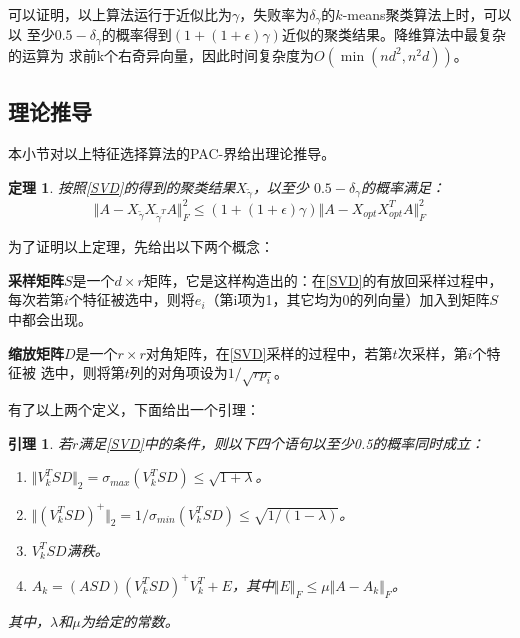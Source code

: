 \documentclass{ctexart}
\begin{document}
    可以证明，以上算法运行于近似比为$\gamma$，失败率为$\delta_\gamma$的$k$-means聚类算法上时，可以以
    至少$0.5-\delta_\gamma$的概率得到$(1+(1+\epsilon)\gamma)$近似的聚类结果。降维算法中最复杂的运算为
    求前k个右奇异向量，因此时间复杂度为$O(\min(nd^2, n^2d))$。

    \subsection{理论推导}
    本小节对以上特征选择算法的PAC-界给出理论推导\cite{boutsidis2009unsupervised,boutsidis2014randomized}。

    \newtheorem{thm}{\bf 定理}[]
    \begin{thm}
    \label{thmsvd}
        按照\autoref{SVD}的得到的聚类结果$X_{\tilde{\gamma}}$，以至少
        $0.5-\delta_\gamma$的概率满足：
        $$
            \Vert A - X_{\tilde{\gamma}} X_{\tilde{\gamma}^T} A \Vert_F^2 \leq (1 + ( 1+\epsilon ) \gamma ) \Vert A - X_{opt} X_{opt}^T A \Vert_F^2
        $$
    \end{thm}

    为了证明以上定理，先给出以下两个概念：

    \textbf{采样矩阵}$S$是一个$d \times r$矩阵，它是这样构造出的：在\autoref{SVD}的有放回采样过程中，
    每次若第$i$个特征被选中，则将$e_i$（第i项为1，其它均为0的列向量）加入到矩阵$S$中都会出现。

    \textbf{缩放矩阵}$D$是一个$r \times r$对角矩阵，在\autoref{SVD}采样的过程中，若第$t$次采样，第$i$个特征被
    选中，则将第$t$列的对角项设为$1 / \sqrt{rp_i}$。

    有了以上两个定义，下面给出一个引理\cite{boutsidis2009unsupervised}：
    \newtheorem{lemma}{\bf 引理}[]
    \begin{lemma}
    \label{lmsvd}
        若$r$满足\autoref{SVD}中的条件，则以下四个语句以至少0.5的概率同时成立：
        \begin{enumerate}
            \item $\Vert V_k^T S D \Vert_2 = \sigma_{max}(V_k^T S D) \leq \sqrt{1 + \lambda}$。
            \item $\Vert (V_k^T S D)^+ \Vert_2 = 1 / \sigma_{min}(V_k^T S D) \leq \sqrt{1 / (1 - \lambda)}$。
            \item $V_k^T S D$满秩。
            \item $A_k = (ASD) (V_k^T SD)^+ V_k^T + E$，其中$\Vert E \Vert_F \leq \mu \Vert A - A_k \Vert_F$。
        \end{enumerate}
        其中，$\lambda$和$\mu$为给定的常数\cite{boutsidis2009unsupervised}。
        
    \end{lemma}
\end{document}
